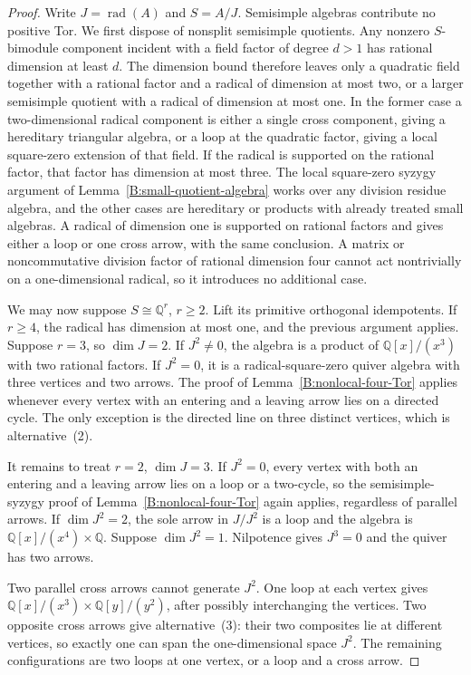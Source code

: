 \begin{proof}
Write $J=\operatorname{rad}(A)$ and $S=A/J$.
Semisimple algebras contribute no positive Tor.
We first dispose of nonsplit semisimple quotients.
Any nonzero $S$-bimodule component incident with a field factor
of degree $d>1$ has rational dimension at least $d$.
The dimension bound therefore leaves only a quadratic field
together with a rational factor and a radical of dimension at
most two, or a larger semisimple quotient with a radical of
dimension at most one.
In the former case a two-dimensional radical component is either
a single cross component, giving a hereditary triangular algebra,
or a loop at the quadratic factor, giving a local square-zero
extension of that field.  If the radical is supported on the
rational factor, that factor has dimension at most three.
The local square-zero syzygy argument of
Lemma~\ref{B:small-quotient-algebra} works over any division
residue algebra, and the other cases are hereditary or products
with already treated small algebras.
A radical of dimension one is supported on rational factors and
gives either a loop or one cross arrow, with the same conclusion.
A matrix or noncommutative division factor of rational dimension
four cannot act nontrivially on a one-dimensional radical, so it
introduces no additional case.

We may now suppose $S\cong\mathbb Q^r$, $r\geq2$.
Lift its primitive orthogonal idempotents.  If $r\geq4$, the
radical has dimension at most one, and the previous argument
applies.  Suppose $r=3$, so $\dim J=2$.
If $J^2\ne0$, the algebra is a product of
$\mathbb Q[x]/(x^3)$ with two rational factors.
If $J^2=0$, it is a radical-square-zero quiver algebra with
three vertices and two arrows.  The proof of
Lemma~\ref{B:nonlocal-four-Tor} applies whenever every vertex
with an entering and a leaving arrow lies on a directed cycle.
The only exception is the directed line on three distinct
vertices, which is alternative~(2).

It remains to treat $r=2$, $\dim J=3$.
If $J^2=0$, every vertex with both an entering and a leaving arrow
lies on a loop or a two-cycle, so the semisimple-syzygy proof of
Lemma~\ref{B:nonlocal-four-Tor} again applies, regardless of
parallel arrows.
If $\dim J^2=2$, the sole arrow in $J/J^2$ is a loop and the
algebra is $\mathbb Q[x]/(x^4)\times\mathbb Q$.
Suppose $\dim J^2=1$.  Nilpotence gives $J^3=0$ and the quiver
has two arrows.

Two parallel cross arrows cannot generate $J^2$.
One loop at each vertex gives
$\mathbb Q[x]/(x^3)\times\mathbb Q[y]/(y^2)$, after possibly
interchanging the vertices.
Two opposite cross arrows give alternative~(3): their two
composites lie at different vertices, so exactly one can span
the one-dimensional space $J^2$.
The remaining configurations are two loops at one vertex, or a
loop and a cross arrow.


\end{proof}

